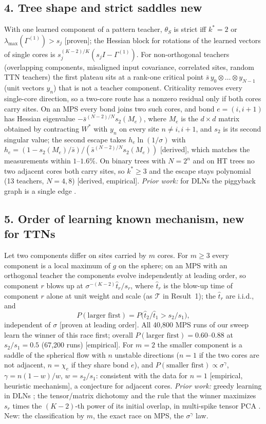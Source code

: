 \documentclass[11pt]{article}
\newcommand{\NEW}{\colorbox{ForestGreen!22}{\textsf{\small new}}}
\newcommand{\TTN}{\colorbox{Goldenrod!30}{\textsf{\small known mechanism, new for TTNs}}}
\newcommand{\ev}[1]{\textsf{\small[#1]}}
\begin{document}
\subsection*{4. Tree shape and strict saddles \hfill\NEW}
With one learned component of a pattern teacher, $\theta_S$ is strict iff $k^*=2$ or
$\lambda_{\max}(\Gamma^{(1)})>s_j$ \ev{proven}; the Hessian block for rotations of the learned vectors of single cores is
$s_j^{(K-2)/K}(s_j I-\Gamma^{(1)})$. For non-orthogonal teachers (overlapping components, misaligned input
covariance, correlated sites, random TTN teachers) the first plateau sits at a rank-one critical point
$\bar s\,y_0\otimes\dots\otimes y_{N-1}$ (unit vectors $y_n$) that is not a teacher component. Criticality removes every single-core
direction, so a two-core route has a nonzero residual only if both cores carry sites. On an MPS every bond
joins two such cores, and bond $e=(i,i+1)$ has Hessian eigenvalue $-\bar s^{(N-2)/N}s_2(M_e)$, where $M_e$ is the
$d\times d$ matrix obtained by contracting $W^*$ with $y_n$ on every site $n\ne i,i+1$, and $s_2$ is its second
singular value; the second escape takes
$h_e\ln(1/\sigma)$ with $h_e=(1-s_2(M_e)/\bar s)/(\bar s^{(N-2)/N}s_2(M_e))$ \ev{derived}, which matches the
measurements within $1$--$1.6\%$. On binary trees with $N=2^n$ and on HT trees no two adjacent cores both carry
sites, so $k^*\ge3$ and the escape stays polynomial (13 teachers, $N=4,8$) \ev{derived, empirical}.
\emph{Prior work:} for DLNs the piggyback graph is a single edge \citep[Thm~7]{achour2024loss}.

\subsection*{5. Order of learning \hfill\TTN}
Let two components differ on sites carried by $m$ cores. For $m\ge3$ every component is a local maximum
of $g$ on the sphere; on an MPS with an orthogonal teacher the components evolve independently at leading
order, so component $r$ blows up at $\sigma^{-(K-2)}\hat t_r/s_r$, where $\hat t_r$ is the blow-up time of
component $r$ alone at unit weight and scale (as $\mathcal T$ in Result~1); the $\hat t_r$ are i.i.d., and
\begin{equation}
P(\text{larger first})=P\big(\hat t_2/\hat t_1>s_2/s_1\big),
\end{equation}
independent of $\sigma$ \ev{proven at leading order}. All 40,800 MPS runs of our sweep learn the winner of
this race first; overall $P(\text{larger first})=0.60$--$0.88$ at $s_2/s_1=0.5$ (67,200 runs) \ev{empirical}.
For $m=2$ the smaller component is a saddle of the spherical flow with $n$ unstable directions ($n=1$ if
the two cores are not adjacent, $n=\chi_e$ if they share bond $e$), and
$P(\text{smaller first})\propto\sigma^{\gamma}$, $\gamma=n(1-w)/w$, $w=s_2/s_1$: consistent with the data for
$n=1$ \ev{empirical, heuristic mechanism}, a conjecture for adjacent cores.
\emph{Prior work:} greedy learning in DLNs \citep[Thm~2]{jacot2022saddletosaddle}; the tensor/matrix
dichotomy and the rule that the winner maximizes $s_r$ times the $(K-2)$-th power of its initial overlap, in multi-spike tensor PCA \citep{benarous2025stochastic}.
New: the classification by $m$, the exact race on MPS, the $\sigma^\gamma$ law.
\end{document}
